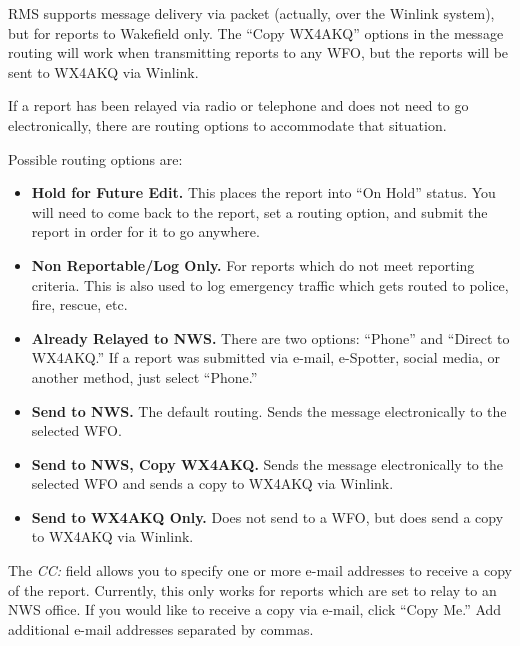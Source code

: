 \documentclass[pdflatex,letterpaper,twoside,12pt]{book}
\begin{document}

RMS supports message delivery via packet (actually, over the Winlink system), but for reports to Wakefield only.  The ``Copy WX4AKQ'' options in the message routing will work when transmitting reports to any WFO, but the reports will be sent to WX4AKQ via Winlink.

If a report has been relayed via radio or telephone and does not need to go electronically, there are routing options to accommodate that situation.

Possible routing options are:

\begin{itemize}
\item \textbf{Hold for Future Edit.}  This places the report into ``On Hold'' status.  You will need to come back to the report, set a routing option, and submit the report in order for it to go anywhere.
\item \textbf{Non Reportable/Log Only.}  For reports which do not meet reporting criteria.  This is also used to log emergency traffic which gets routed to police, fire, rescue, etc.
\item \textbf{Already Relayed to NWS.}  There are two options:  ``Phone'' and ``Direct to WX4AKQ.''  If a report was submitted via e-mail, e-Spotter, social media, or another method, just select ``Phone.''
\item \textbf{Send to NWS.}  The default routing.  Sends the message electronically to the selected WFO.
\item \textbf{Send to NWS, Copy WX4AKQ.}  Sends the message electronically to the selected WFO and sends a copy to WX4AKQ via Winlink.
\item \textbf{Send to WX4AKQ Only.}  Does not send to a WFO, but does send a copy to WX4AKQ via Winlink.
\end{itemize}

The \emph{CC:} field allows you to specify one or more e-mail addresses to receive a copy of the report.  Currently, this only works for reports which are set to relay to an NWS office.  If you would like to receive a copy via e-mail, click ``Copy Me.'' Add additional e-mail addresses separated by commas.
\end{document}
